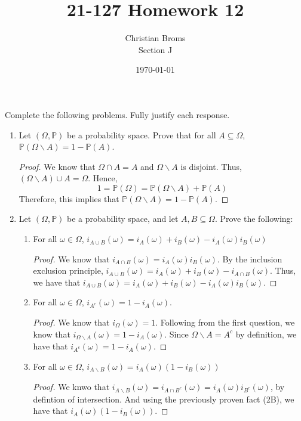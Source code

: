 \documentclass[12pt]{article}
\newcommand{\ba}{\backslash}
\renewcommand{\P}{\mathbb{P}}
\newcommand{\p}[1]{\P\left(#1\right)}
\begin{document}
\title{21-127 Homework 12
}
\author{Christian Broms \\ Section J}
\date{\today}
\maketitle
Complete the following problems. Fully justify each response.


\begin{enumerate}

\item Let $(\Omega, \P)$ be a probability space. Prove that for all $A\subseteq \Omega$, $\p{\Omega\ba A} = 1-\p{A}$.

\begin{proof}
We know that $\Omega \cap A = A$ and $\Omega \ba A$ is disjoint. Thus, $(\Omega \ba A) \cup A = \Omega $. Hence, $$ 1 = \p{\Omega} = \p{\Omega \ba A } + \p{A}$$
Therefore, this implies that $\p{\Omega \ba A} = 1 - \p{A}$.  
\end{proof}

\item Let $(\Omega, \P)$ be a probability space, and let $A, B\subseteq \Omega$. Prove the following:
\begin{enumerate}
\item For all $\omega\in\Omega$, $i_{A\cup B}(\omega) = i_{A}(\omega)+i_{B}(\omega)-i_{A}(\omega)i_{B}(\omega)$

\begin{proof}
We know that $i_{A\cap B}(\omega) = i_A(\omega)i_B(\omega)$. By the inclusion exclusion principle, $i_{A\cup B}(\omega) = i_A(\omega) + i_B(\omega) - i_{A \cap B}(\omega)$. Thus, we have that $i_{A\cup B}(\omega) = i_A(\omega) + i_B(\omega) - i_A(\omega)i_B(\omega)$.  
\end{proof}
\item For all $\omega\in\Omega$, $i_{A^c}(\omega) = 1-i_A(\omega)$.

\begin{proof}
We know that $i_{\Omega}(\omega) = 1$. Following from the first question, we know that $i_{\Omega \ba A}(\omega) = 1 - i_A(\omega)$. Since $\Omega \ba A = A^c$ by definition, we have that $i_{A^c}(\omega) = 1-i_A(\omega)$.
\end{proof}
\item For all $\omega\in\Omega$, $i_{A\ba B}(\omega) = i_A(\omega)(1-i_B(\omega))$
\begin{proof}
We knwo that $i_{A\ba B}(\omega) = i_{A \cap B^c}(\omega) = i_A(\omega)i_{B^c}(\omega)$, by defintion of intersection. And using the previously proven fact (2B), we have that $i_A(\omega)(1- i_B(\omega))$. 
\end{proof}
\end{enumerate}


\end{enumerate}
\end{document}
